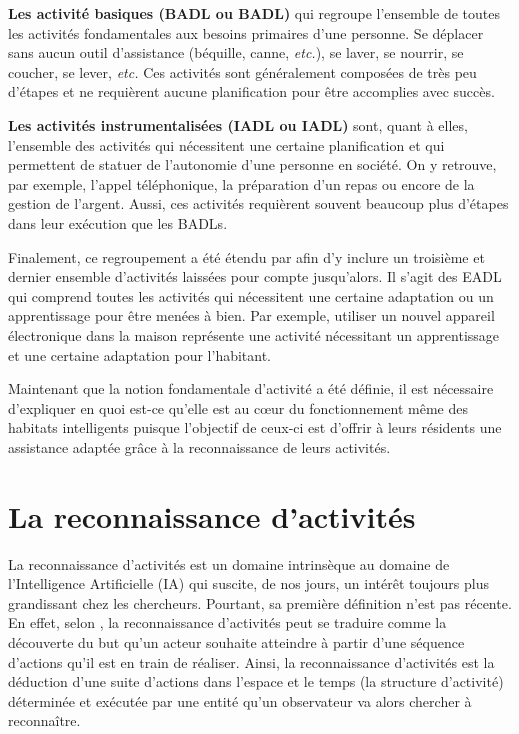 {\textbf{Les activité basiques (\acl{BADL} ou \acs{BADL})} qui regroupe l'ensemble de toutes les activités fondamentales aux besoins primaires d'une personne. Se déplacer sans aucun outil d'assistance (béquille, canne, \textit{etc.}), se laver, se nourrir, se coucher, se lever, \textit{etc.} Ces activités sont généralement composées de très peu d'étapes et ne requièrent aucune planification pour être accomplies avec succès. 

{\textbf{Les activités instrumentalisées (\acl{IADL} ou \acs{IADL})} sont, quant à elles, l'ensemble des activités qui nécessitent une certaine planification et qui permettent de statuer de l'autonomie d'une personne en société. On y retrouve, par exemple, l'appel téléphonique, la préparation d'un repas ou encore de la gestion de l'argent. Aussi, ces activités requièrent souvent beaucoup plus d'étapes dans leur exécution que les \acsp{BADL}.

Finalement, ce regroupement a été étendu par \cite{Rogers1998} afin d'y inclure un troisième et dernier ensemble d'activités laissées pour compte jusqu'alors. Il s'agit des \ac{EADL} qui comprend toutes les activités qui nécessitent une certaine adaptation ou un apprentissage pour être menées à bien. Par exemple, utiliser un nouvel appareil électronique dans la maison représente une activité nécessitant un apprentissage et une certaine adaptation pour l'habitant. 

Maintenant que la notion fondamentale d'activité a été définie, il est nécessaire d'expliquer en quoi est-ce qu'elle est au c\oe{}ur du fonctionnement même des habitats intelligents puisque l'objectif de ceux-ci est d'offrir à leurs résidents une assistance adaptée grâce à la reconnaissance de leurs activités.

\section{La reconnaissance d'activités}

La reconnaissance d'activités est un domaine intrinsèque au domaine de l'Intelligence Artificielle (\acs{IA}) qui suscite, de nos jours, un intérêt toujours plus grandissant chez les chercheurs. Pourtant, sa première définition n'est pas récente. En effet, selon \cite{Schmidt1978}, la reconnaissance d'activités peut se traduire comme la découverte du but qu'un acteur souhaite atteindre à partir d'une séquence d'actions qu'il est en train de réaliser. Ainsi, la reconnaissance d'activités est la déduction d'une suite d'actions dans l'espace et le temps (la structure d'activité) déterminée et exécutée par une entité qu'un observateur va alors chercher à reconnaître. 

}}
